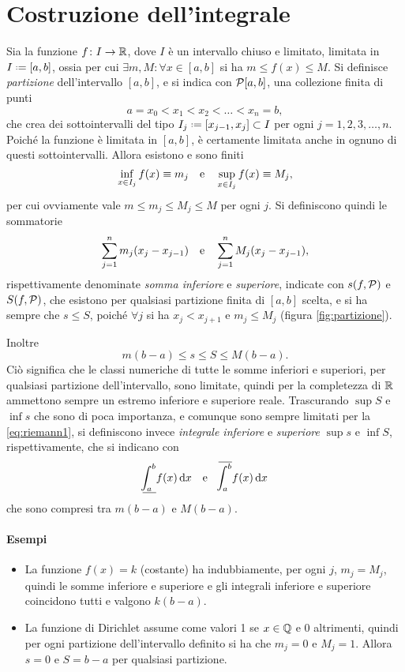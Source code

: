 \section{Costruzione dell'integrale}
Sia la funzione $f\colon I\to\mathbb{R}$, dove $I$ è un intervallo chiuso e limitato, limitata in $I\defeq[a,b]$, ossia per cui $\exists m,M\colon\forall x\in [a,b]$ si ha $m\leq f(x)\leq M$.
Si definisce \emph{partizione} dell'intervallo $[a,b]$, e si indica con $\mathcal{P}[a,b]$, una collezione finita di punti
\[
a=x_0<x_1<x_2<\dots<x_n=b,
\]
che crea dei sottointervalli del tipo $I_j\defeq[x_{j-1},x_j]\subset I$ per ogni $j=1,2,3,\dots,n$. Poiché la funzione è limitata in $[a,b]$, è certamente limitata anche in ognuno di questi sottointervalli. Allora esistono e sono finiti
\[
\inf_{x\in I_j}f(x)\equiv m_j\quad\text{e}\quad\sup_{x\in I_j}f(x)\equiv M_j,
\]
per cui ovviamente vale $m\leq m_j\leq M_j\leq M$ per ogni $j$.
Si definiscono quindi le sommatorie
\[
\sum_{j=1}^nm_j(x_j-x_{j-1})\quad\text{e}\quad\sum_{j=1}^nM_j(x_j-x_{j-1}),
\]
rispettivamente denominate \emph{somma inferiore} e \emph{superiore}, indicate con $s(f,\mathcal{P})$ e $S(f,\mathcal{P})$, che esistono per qualsiasi partizione finita di $[a,b]$ scelta, e si ha sempre che $s\leq S$, poiché $\forall j$ si ha $x_j<x_{j+1}$ e $m_j\leq M_j$ (figura \ref{fig:partizione}).

Inoltre
\begin{equation} \label{eq:riemann1}
m(b-a)\leq s\leq S\leq M(b-a).
\end{equation}
Ciò significa che le classi numeriche di tutte le somme inferiori e superiori, per qualsiasi partizione dell'intervallo, sono limitate, quindi per la completezza di $\mathbb{R}$ ammettono sempre un estremo inferiore e superiore reale. Trascurando $\sup S$ e $\inf s$ che sono di poca importanza, e comunque sono sempre limitati per la \eqref{eq:riemann1}, si definiscono invece \emph{integrale inferiore} e \emph{superiore} $\sup s$ e $\inf S$, rispettivamente, che si indicano con
\[
\underline{\!\int_a^b} f(x)\,\textup{d} x\quad\text{e}\quad\overline{\!\int_a^b} f(x)\,\textup{d} x
\]
che sono compresi tra $m(b-a)$ e $M(b-a)$.

\paragraph{Esempi}
\begin{itemize}
\item La funzione $f(x)=k$ (costante) ha indubbiamente, per ogni $j$, $m_j=M_j$, quindi le somme inferiore e superiore e gli integrali inferiore e superiore coincidono tutti e valgono $k(b-a)$.
\item La funzione di Dirichlet assume come valori 1 se $x\in\mathbb{Q}$ e 0 altrimenti, quindi per ogni partizione dell'intervallo definito si ha che $m_j=0$ e $M_j=1$. Allora $s=0$ e $S=b-a$ per qualsiasi partizione.
\end{itemize}

